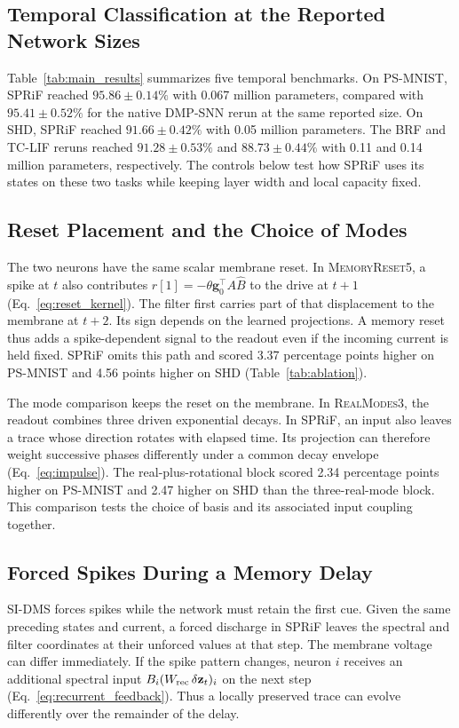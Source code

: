 \documentclass[letterpaper,journal]{IEEEtran}
\newcommand{\mr}{\textnormal{\textsc{MemoryReset5}}}
\newcommand{\rmodes}{\textnormal{\textsc{RealModes3}}}
\begin{document}
\subsection{Temporal Classification at the Reported Network Sizes}

Table~\ref{tab:main_results} summarizes five temporal benchmarks. On PS-MNIST, SPRiF reached $95.86\pm0.14\%$ with 0.067 million parameters, compared with $95.41\pm0.52\%$ for the native DMP-SNN rerun at the same reported size. On SHD, SPRiF reached $91.66\pm0.42\%$ with 0.05 million parameters. The BRF and TC-LIF reruns reached $91.28\pm0.53\%$ and $88.73\pm0.44\%$ with 0.11 and 0.14 million parameters, respectively. The controls below test how SPRiF uses its states on these two tasks while keeping layer width and local capacity fixed.

\subsection{Reset Placement and the Choice of Modes}

The two neurons have the same scalar membrane reset. In \mr{}, a spike at $t$ also contributes $r[1]=-\theta\mathbf g_0^\top A\widehat B$ to the drive at $t+1$ (Eq.~\eqref{eq:reset_kernel}). The filter first carries part of that displacement to the membrane at $t+2$. Its sign depends on the learned projections. A memory reset thus adds a spike-dependent signal to the readout even if the incoming current is held fixed. SPRiF omits this path and scored 3.37 percentage points higher on PS-MNIST and 4.56 points higher on SHD (Table~\ref{tab:ablation}).

The mode comparison keeps the reset on the membrane. In \rmodes{}, the readout combines three driven exponential decays. In SPRiF, an input also leaves a trace whose direction rotates with elapsed time. Its projection can therefore weight successive phases differently under a common decay envelope (Eq.~\eqref{eq:impulse}). The real-plus-rotational block scored 2.34 percentage points higher on PS-MNIST and 2.47 higher on SHD than the three-real-mode block. This comparison tests the choice of basis and its associated input coupling together.

\subsection{Forced Spikes During a Memory Delay}

SI-DMS forces spikes while the network must retain the first cue. Given the same preceding states and current, a forced discharge in SPRiF leaves the spectral and filter coordinates at their unforced values at that step. The membrane voltage can differ immediately. If the spike pattern changes, neuron $i$ receives an additional spectral input $B_i(W_{\rm rec}\,\delta\mathbf z_t)_i$ on the next step (Eq.~\eqref{eq:recurrent_feedback}). Thus a locally preserved trace can evolve differently over the remainder of the delay.
\end{document}
